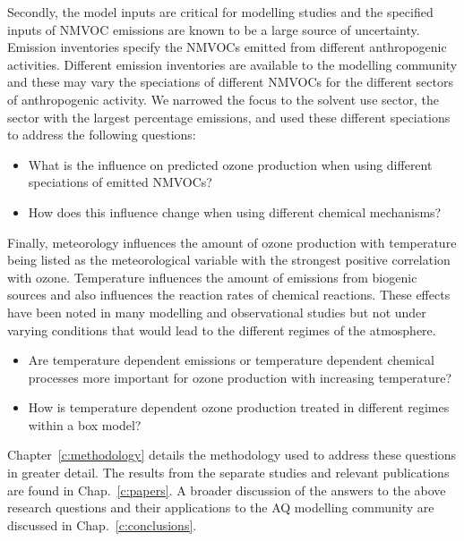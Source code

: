 Secondly, the model inputs are critical for modelling studies and the specified inputs of NMVOC emissions are known to be a large source of uncertainty.
Emission inventories specify the NMVOCs emitted from different anthropogenic activities.
Different emission inventories are available to the modelling community and these may vary the speciations of different NMVOCs for the different sectors of anthropogenic activity.
We narrowed the focus to the solvent use sector, the sector with the largest percentage emissions, and used these different speciations to address the following questions:
\begin{itemize}
	\item What is the influence on predicted ozone production when using different speciations of emitted NMVOCs? 
    \item How does this influence change when using different chemical mechanisms?
\end{itemize}

Finally, meteorology influences the amount of ozone production with temperature being listed as the meteorological variable with the strongest positive correlation with ozone.
Temperature influences the amount of emissions from biogenic sources and also influences the reaction rates of chemical reactions.
These effects have been noted in many modelling and observational studies but not under varying  conditions that would lead to the different  regimes of the atmosphere.
\begin{itemize}
    \item Are temperature dependent emissions or temperature dependent chemical processes more important for ozone production with increasing temperature? 
    \item How is temperature dependent ozone production treated in different  regimes within a box model?
\end{itemize}

Chapter~\ref{c:methodology} details the methodology used to address these questions in greater detail.
The results from the separate studies and relevant publications are found in Chap.~\ref{c:papers}.
A broader discussion of the answers to the above research questions and their applications to the AQ modelling community are discussed in Chap.~\ref{c:conclusions}.
